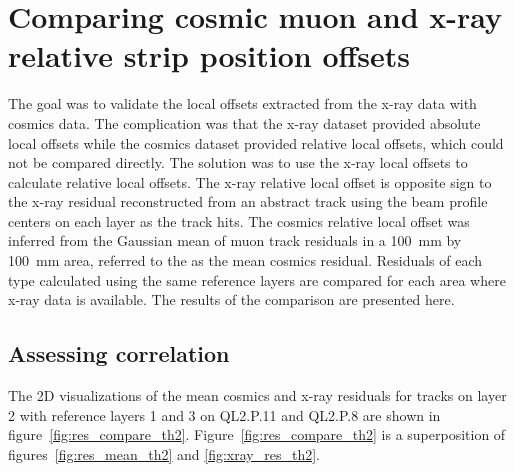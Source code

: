 
\chapter{Comparing cosmic muon and x-ray relative strip position offsets}
\label{chap:comparison}

The goal was to validate the local offsets extracted from the x-ray data with cosmics data. The complication was that the x-ray dataset provided absolute local offsets while the cosmics dataset provided relative local offsets, which could not be compared directly. The solution was to use the x-ray local offsets to calculate relative local offsets. The x-ray relative local offset is opposite sign to the x-ray residual reconstructed from an abstract track using the beam profile centers on each layer as the track hits. The cosmics relative local offset was inferred from the Gaussian mean of muon track residuals in a \SI{100}{mm} by \SI{100}{mm} area, referred to the as the mean cosmics residual. Residuals of each type calculated using the same reference layers are compared for each area where x-ray data is available. The  results of the comparison are presented here.



\section{Assessing correlation}
\label{sec:assessing_correlation}

The 2D visualizations of the mean cosmics and x-ray residuals for tracks on layer 2 with reference layers 1 and 3 on QL2.P.11 and QL2.P.8 are shown in figure~\ref{fig:res_compare_th2}. Figure~\ref{fig:res_compare_th2} is a superposition of figures~\ref{fig:res_mean_th2} and \ref{fig:xray_res_th2}.

